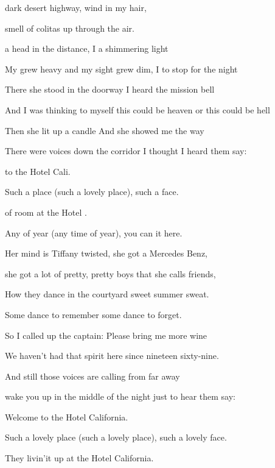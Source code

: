 

       

\zs
{} dark desert highway,
 wind in my hair,

 smell of colitas
 up through the air.

 a head in the distance,
I  a shimmering light

My  grew heavy and my sight grew dim,
I  to stop for the night
\ks

\zs
There she stood in the doorway
I heard the mission bell

And I was thinking to myself
this could be heaven or this could be hell

Then she lit up a candle
And she showed me the way

There were voices down the corridor
I thought I heard them say:
\ks

\zr
{} to the Hotel Cali.

Such a  place (such a lovely place),
such a  face.

 of room at the Hotel .

Any  of year (any time of year),
you can  it here.
\kr

\zs
Her mind is Tiffany twisted,
she got a Mercedes Benz,

she got a lot of pretty,
pretty boys that she calls friends,

How they dance in the courtyard
sweet summer sweat.

Some dance to remember
some dance to forget.
\ks

\zs
So I called up the captain:
Please bring me more wine

We haven't had that spirit
here since nineteen sixty-nine.

And still those voices are calling from far away

wake you up in the middle of the night
just to hear them say:
\ks

\zr
Welcome to the Hotel California.

Such a lovely place (such a lovely place),
such a lovely face.

They livin'it up at the Hotel California.

